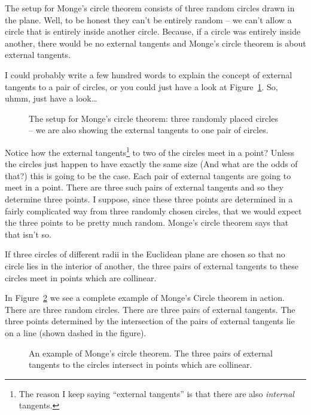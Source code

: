 The setup for Monge's circle theorem consists of three random circles
drawn in the plane.  Well, to be honest they can't be entirely random --
we can't allow a circle that is entirely inside another circle.  Because,
if a circle was entirely inside another, there would be no external tangents
and Monge's circle theorem is about external tangents.

I could probably write a few hundred words to explain the concept of 
external tangents to a pair of circles, or you could just have a look at
Figure~\ref{fig:monge1}.  So, uhmm, just have a look\ldots

\begin{figure}[!hbtp] 
\begin{center}

\end{center}
\caption[Setup for Monge's circle theorem.]{The setup for Monge's circle theorem: three randomly placed circles -- we are also showing the external tangents to
one pair of circles.}
\label{fig:monge1}
\end{figure}
 
Notice how the external tangents\footnote{The reason I keep saying ``external tangents'' is that there are also \emph{internal} tangents.} to two of the circles meet in a point?  Unless the circles just happen to have exactly the same size
(And what are the odds of that?) this is going to be the case.  Each pair of external tangents are going to meet in a point.  There are three such pairs of external tangents and so they determine three points.  I suppose, since these three 
points are determined in a fairly complicated way from three randomly chosen
circles, that we would expect the three points to be pretty much random.
Monge's circle theorem says that that isn't so.

\begin{thm} 
If three circles of different radii in the Euclidean plane are 
chosen so that no circle lies in the interior of another, the 
three pairs of external tangents to these circles meet in 
points which are collinear.
\end{thm}

In Figure~\ref{fig:monge2} we see a complete example of Monge's Circle theorem
in action.  There are three random circles.  There are three pairs of external
tangents.  The three points determined by the intersection of the pairs of 
external tangents lie on a line (shown dashed in the figure).
 
\begin{figure}[!hbtp] 
\begin{center}

\end{center}
\caption[Example of Monge's circle theorem.]{An example of Monge's %
circle theorem.  The three pairs of external %
tangents to the circles intersect in points which are collinear.}
\label{fig:monge2}
\end{figure}
 
